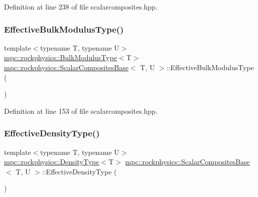 Definition at line 238 of file scalarcomposites.\+hpp.

\mbox{\label{classmpc_1_1rockphysics_1_1_scalar_composites_base_abf9cbdafe0b2db8ef6022c5ea6ea74f1}} 
\subsubsection{\texorpdfstring{Effective\+Bulk\+Modulus\+Type()}{EffectiveBulkModulusType()}}
{\footnotesize\ttfamily template$<$typename T, typename U$>$ \\
\mbox{\hyperlink{structmpc_1_1rockphysics_1_1_bulk_modulus_type}{mpc\+::rockphysics\+::\+Bulk\+Modulus\+Type}}$<$T$>$ \mbox{\hyperlink{classmpc_1_1rockphysics_1_1_scalar_composites_base}{mpc\+::rockphysics\+::\+Scalar\+Composites\+Base}}$<$ T, U $>$\+::Effective\+Bulk\+Modulus\+Type (\begin{DoxyParamCaption}{ }\end{DoxyParamCaption})\hspace{0.3cm}{\ttfamily [inline]}}



Definition at line 153 of file scalarcomposites.\+hpp.

\mbox{\label{classmpc_1_1rockphysics_1_1_scalar_composites_base_aa9757cc729294537fe5045a1e26e0b35}} 
\subsubsection{\texorpdfstring{Effective\+Density\+Type()}{EffectiveDensityType()}}
{\footnotesize\ttfamily template$<$typename T, typename U$>$ \\
\mbox{\hyperlink{structmpc_1_1rockphysics_1_1_density_type}{mpc\+::rockphysics\+::\+Density\+Type}}$<$T$>$ \mbox{\hyperlink{classmpc_1_1rockphysics_1_1_scalar_composites_base}{mpc\+::rockphysics\+::\+Scalar\+Composites\+Base}}$<$ T, U $>$\+::Effective\+Density\+Type (\begin{DoxyParamCaption}{ }\end{DoxyParamCaption})\hspace{0.3cm}{\ttfamily [inline]}}



